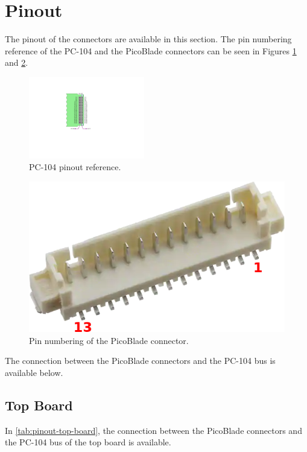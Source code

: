\section{Pinout}

The pinout of the connectors are available in this section. The pin numbering reference of the PC-104 and the PicoBlade connectors can be seen in Figures \ref{fig:pc104-reference} and \ref{fig:picoblade-pin-ref}.

\begin{figure}[!htb]
    \begin{center}
        \includegraphics[width=0.45\textwidth]{figures/pc104-diagram}
        \caption{PC-104 pinout reference.}
        \label{fig:pc104-reference}
    \end{center}
\end{figure}

\begin{figure}[!htb]
    \begin{center}
        \includegraphics[width=0.5\columnwidth]{figures/picoblade-pin-ref}
        \caption{Pin numbering of the PicoBlade connector.}
        \label{fig:picoblade-pin-ref}
    \end{center}
\end{figure}

The connection between the PicoBlade connectors and the PC-104 bus is available below.

\subsection{Top Board}

In \autoref{tab:pinout-top-board}, the connection between the PicoBlade connectors and the PC-104 bus of the top board is available.

